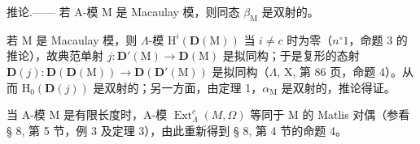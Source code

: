 推论.—— 若 A-模 M 是 Macaulay 模，则同态 \(\beta_{\mathrm{M}}\) 是双射的。

若 M 是 Macaulay 模，则 \(\Lambda\)-模 \(\mathrm{H}^i(\mathbf{D}(\mathrm{M}))\) 当 \(i \neq c\) 时为零（\(n^\circ 1\)，命题 3 的推论），故典范单射 \(j: \mathbf{D}'(\mathrm{M}) \to \mathbf{D}(\mathrm{M})\) 是拟同构；于是复形的态射 \(\mathbf{D}(j): \mathbf{D}(\mathbf{D}(\mathrm{M})) \to \mathbf{D}(\mathbf{D}'(\mathrm{M}))\) 是拟同构（\(\Lambda\), X, 第 86 页，命题 4）。从而 \(\mathrm{H}_0(\mathbf{D}(j))\) 是双射的；另一方面，由定理 1，\(\alpha_{\mathrm{M}}\) 是双射的，推论得证。

当 A-模 M 是有限长度时，A-模 \(\operatorname{Ext}_{\Lambda}^{c}(M,\Omega)\) 等同于 M 的 Matlis 对偶（参看 § 8, 第 5 节，例 3 及定理 3），由此重新得到 § 8, 第 4 节的命题 4。


